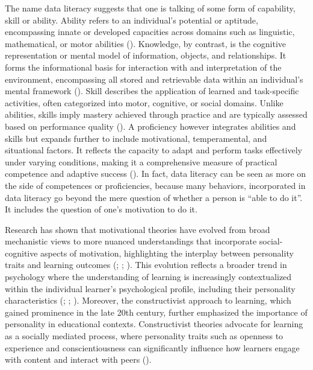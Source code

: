 \documentclass[
  12pt,
  a4paper,
  twoside]{article}
\begin{document}
The name data literacy suggests that one is talking of some form of capability, skill or ability.
Ability refers to an individual's potential or aptitude, encompassing innate or developed capacities across domains such as linguistic, mathematical, or motor abilities ().
Knowledge, by contrast, is the cognitive representation or mental model of information, objects, and relationships. It forms the informational basis for interaction with and interpretation of the environment, encompassing all stored and retrievable data within an individual's mental framework ().
Skill describes the application of learned and task-specific activities, often categorized into motor, cognitive, or social domains. Unlike abilities, skills imply mastery achieved through practice and are typically assessed based on performance quality ().
A proficiency however integrates abilities and skills but expands further to include motivational, temperamental, and situational factors. It reflects the capacity to adapt and perform tasks effectively under varying conditions, making it a comprehensive measure of practical competence and adaptive success ().
In fact, data literacy can be seen as more on the side of competences or proficiencies, because many behaviors, incorporated in data literacy go beyond the mere question of whether a person is ``able to do it''. It includes the question of one's motivation to do it.

Research has shown that motivational theories have evolved from broad mechanistic views to more nuanced understandings that incorporate social-cognitive aspects of motivation, highlighting the interplay between personality traits and learning outcomes (; ; ). This evolution reflects a broader trend in psychology where the understanding of learning is increasingly contextualized within the individual learner's psychological profile, including their personality characteristics (; ; ).
Moreover, the constructivist approach to learning, which gained prominence in the late 20th century, further emphasized the importance of personality in educational contexts. Constructivist theories advocate for learning as a socially mediated process, where personality traits such as openness to experience and conscientiousness can significantly influence how learners engage with content and interact with peers ().
\end{document}
